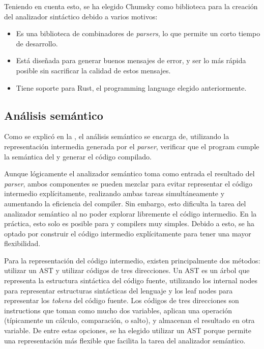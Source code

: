 Teniendo en cuenta esto, se ha elegido Chumsky como biblioteca para la creación
del analizador sintáctico debido a varios motivos:

\begin{itemize}
    \item Es una biblioteca de combinadores de \textit{\glspl{parser}}, lo que
    permite un corto tiempo de desarrollo.
    \item Está diseñada para generar buenos mensajes de error, y ser lo más
    rápida posible sin sacrificar la calidad de estos mensajes.
    \item Tiene soporte para Rust, el \gls{programming language} elegido
    anteriormente.
\end{itemize}

\subsection{Análisis semántico}\label{subsec:compiler}

Como se explicó en la , el análisis semántico se
encarga de, utilizando la representación intermedia generada por el
\textit{\gls{parser}}, verificar que el \gls{program} cumple la semántica del
 y generar el código compilado.

Aunque lógicamente el analizador semántico toma como entrada el resultado del
\textit{\gls{parser}}, ambos componentes se pueden mezclar para evitar
representar el código intermedio explícitamente, realizando ambas tareas
simultáneamente y aumentando la eficiencia del \gls{compiler}. Sin embargo, esto
dificulta la tarea del analizador semántico al no poder explorar libremente el
código intermedio. En la práctica, esto solo es posible para
 y \glspl{compiler} muy simples. Debido
a esto, se ha optado por construir el código intermedio explícitamente para
tener una mayor flexibilidad. \parencite{compiler-design}

Para la representación del código intermedio, existen principalmente dos
métodos: utilizar un \gls{AST} y utilizar códigos de tres direcciones. Un
\gls{AST} es un árbol que representa la estructura sintáctica del código fuente,
utilizando los \glspl{internal node} para representar estructuras sintácticas
del lenguaje y los \glspl{leaf node} para representar los \textit{\glspl{token}}
del código fuente. Los códigos de tres direcciones son \glspl{instruction} que
toman como mucho dos variables, aplican una operación (típicamente un cálculo,
comparación, o salto), y almacenan el resultado en otra variable. De entre estas
opciones, se ha elegido utilizar un \gls{AST} porque permite una representación
más flexible que facilita la tarea del analizador semántico.
\parencite{dragon-book}

